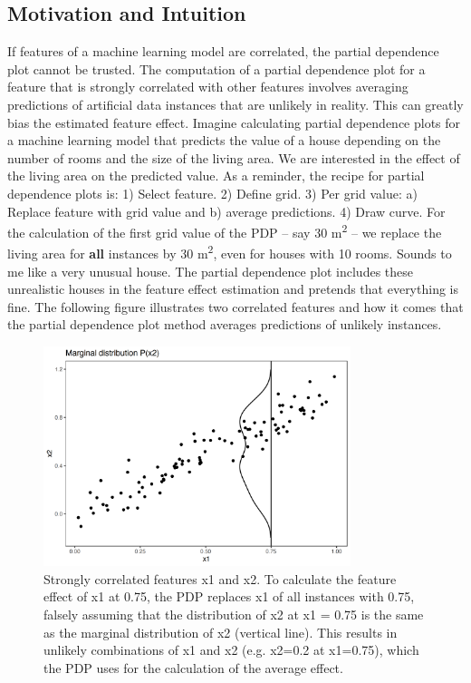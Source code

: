 \documentclass[
  10pt,
]{scrbook}
\begin{document}
\hypertarget{motivation-and-intuition}{%
\subsection{Motivation and Intuition}\label{motivation-and-intuition}}

If features of a machine learning model are correlated, the partial dependence plot cannot be trusted.
The computation of a partial dependence plot for a feature that is strongly correlated with other features involves averaging predictions of artificial data instances that are unlikely in reality.
This can greatly bias the estimated feature effect.
Imagine calculating partial dependence plots for a machine learning model that predicts the value of a house depending on the number of rooms and the size of the living area.
We are interested in the effect of the living area on the predicted value.
As a reminder, the recipe for partial dependence plots is: 1) Select feature. 2) Define grid. 3) Per grid value: a) Replace feature with grid value and b) average predictions. 4) Draw curve.
For the calculation of the first grid value of the PDP -- say 30 m\textsuperscript{2} -- we replace the living area for \textbf{all} instances by 30 m\textsuperscript{2}, even for houses with 10 rooms.
Sounds to me like a very unusual house.
The partial dependence plot includes these unrealistic houses in the feature effect estimation and pretends that everything is fine.
The following figure illustrates two correlated features and how it comes that the partial dependence plot method averages predictions of unlikely instances.

\begin{figure}

{\centering \includegraphics[width=0.8\textwidth]{images/aleplot-motivation1-1} 

}

\caption{Strongly correlated features x1 and x2. To calculate the feature effect of x1 at 0.75, the PDP replaces x1 of all instances with 0.75, falsely assuming that the distribution of x2 at x1 = 0.75 is the same as the marginal distribution of x2 (vertical line). This results in unlikely combinations of x1 and x2 (e.g. x2=0.2 at x1=0.75), which the PDP uses for the calculation of the average effect.}\label{fig:aleplot-motivation1}
\end{figure}
\end{document}
